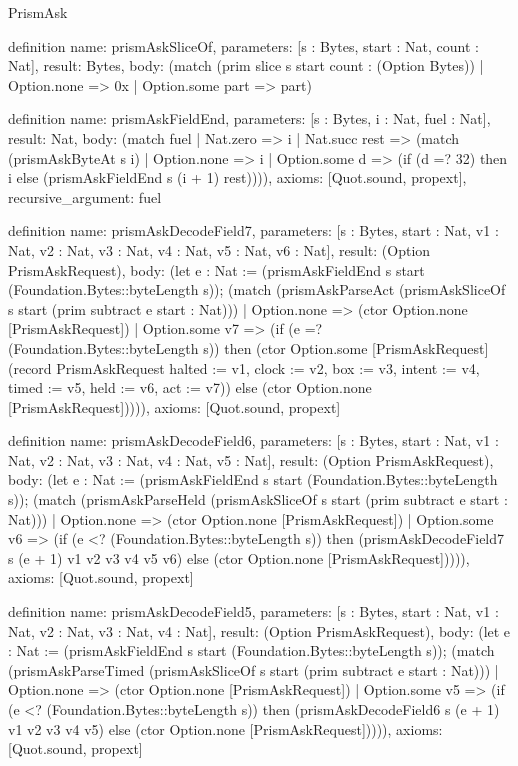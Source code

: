 \begin{lexlean}{PrismAsk}
\begin{semanticmodule}
definition{
  name: prismAskSliceOf,
  parameters: [s : Bytes, start : Nat, count : Nat],
  result: Bytes,
  body: (match (prim slice s start count : (Option Bytes))
    | Option.none => 0x
    | Option.some part => part)
}

definition{
  name: prismAskFieldEnd,
  parameters: [s : Bytes, i : Nat, fuel : Nat],
  result: Nat,
  body: (match fuel
    | Nat.zero => i
    | Nat.succ rest => (match (prismAskByteAt s i)
      | Option.none => i
      | Option.some d => (if (d =? 32) then i else (prismAskFieldEnd s (i + 1) rest)))),
  axioms: [Quot.sound, propext],
  recursive_argument: fuel
}

definition{
  name: prismAskDecodeField7,
  parameters: [s : Bytes, start : Nat, v1 : Nat, v2 : Nat, v3 : Nat, v4 : Nat, v5 : Nat, v6 : Nat],
  result: (Option PrismAskRequest),
  body: (let e : Nat := (prismAskFieldEnd s start (Foundation.Bytes::byteLength s)); (match (prismAskParseAct (prismAskSliceOf s start (prim subtract e start : Nat)))
    | Option.none => (ctor Option.none [PrismAskRequest])
    | Option.some v7 => (if (e =? (Foundation.Bytes::byteLength s)) then (ctor Option.some [PrismAskRequest] (record PrismAskRequest {halted := v1, clock := v2, box := v3, intent := v4, timed := v5, held := v6, act := v7})) else (ctor Option.none [PrismAskRequest])))),
  axioms: [Quot.sound, propext]
}

definition{
  name: prismAskDecodeField6,
  parameters: [s : Bytes, start : Nat, v1 : Nat, v2 : Nat, v3 : Nat, v4 : Nat, v5 : Nat],
  result: (Option PrismAskRequest),
  body: (let e : Nat := (prismAskFieldEnd s start (Foundation.Bytes::byteLength s)); (match (prismAskParseHeld (prismAskSliceOf s start (prim subtract e start : Nat)))
    | Option.none => (ctor Option.none [PrismAskRequest])
    | Option.some v6 => (if (e <? (Foundation.Bytes::byteLength s)) then (prismAskDecodeField7 s (e + 1) v1 v2 v3 v4 v5 v6) else (ctor Option.none [PrismAskRequest])))),
  axioms: [Quot.sound, propext]
}

definition{
  name: prismAskDecodeField5,
  parameters: [s : Bytes, start : Nat, v1 : Nat, v2 : Nat, v3 : Nat, v4 : Nat],
  result: (Option PrismAskRequest),
  body: (let e : Nat := (prismAskFieldEnd s start (Foundation.Bytes::byteLength s)); (match (prismAskParseTimed (prismAskSliceOf s start (prim subtract e start : Nat)))
    | Option.none => (ctor Option.none [PrismAskRequest])
    | Option.some v5 => (if (e <? (Foundation.Bytes::byteLength s)) then (prismAskDecodeField6 s (e + 1) v1 v2 v3 v4 v5) else (ctor Option.none [PrismAskRequest])))),
  axioms: [Quot.sound, propext]
}


\end{semanticmodule}
\end{lexlean}
